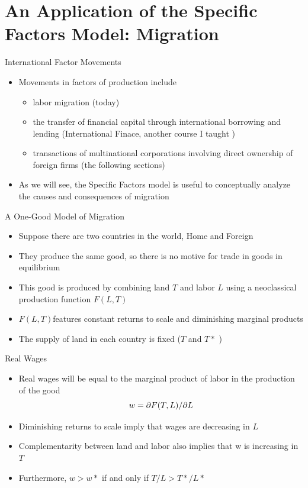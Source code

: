 \documentclass[10pt,hyperref={CJKbookmarks=true},xcolor=dvipsnames,aspectratio=169]{beamer}
\begin{document}
\section{An Application of the Specific Factors Model: Migration}
\begin{frame}{International Factor Movements }

\begin{itemize}
	\item Movements in factors of production include 
	
	\begin{itemize}
		\item labor migration (today) 
		\item the transfer of financial capital through international borrowing
		and lending (International Finace, another course I taught ) 
		\item transactions of multinational corporations involving direct ownership
		of foreign firms (the following sections) 
	\end{itemize}
	\item As we will see, the Specific Factors model is useful to conceptually
	analyze the causes and consequences of migration 
\end{itemize}
\end{frame}

\begin{frame}{A One-Good Model of Migration}

\begin{itemize}
\item Suppose there are two countries in the world, Home and Foreign 
\item They produce the same good, so there is no motive for trade in goods
in equilibrium 
\item This good is produced by combining land $T$ and labor $L$ using
a neoclassical production function $F(L,T)$ 
\item $F(L,T)$features constant returns to scale and diminishing marginal
products 
\item The supply of land in each country is fixed ($T$ and $T*$ ) 
\end{itemize}
\end{frame}

\begin{frame}{Real Wages }

\begin{itemize}
\item Real wages will be equal to the marginal product of labor in the production
of the good 
\[
w=\text{\ensuremath{\partial}}F(T,L)/\text{\ensuremath{\partial}}L
\]

\item Diminishing returns to scale imply that wages are decreasing in $L$ 
\item Complementarity between land and labor also implies that w is increasing
in $T$ 
\item Furthermore, $w>w*$ if and only if $T/L>T*/L*$ 
\end{itemize}
\end{frame}
\end{document}
